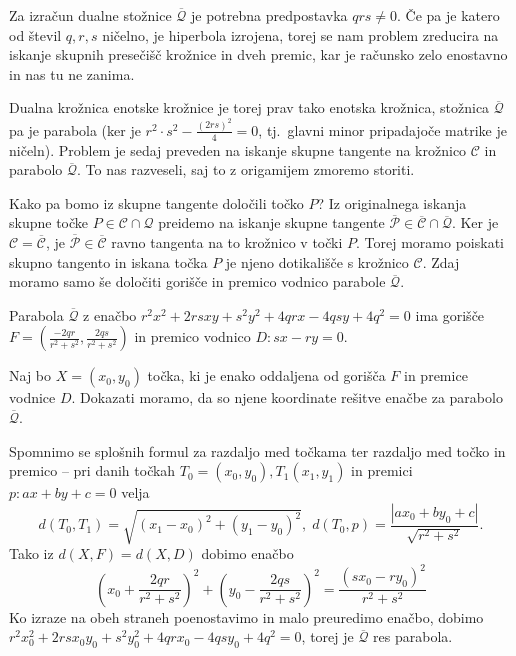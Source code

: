 \begin{opomba}
    Za izračun dualne stožnice $\mathcal{\overline{Q}}$ je potrebna predpostavka $qrs \neq 0$. Če pa je katero od števil $q, r, s$ ničelno, je hiperbola izrojena, torej se nam problem zreducira na iskanje skupnih presečišč krožnice in dveh premic, kar je računsko zelo enostavno in nas tu ne zanima.
\end{opomba}

Dualna krožnica enotske krožnice je torej prav tako enotska krožnica, stožnica $\mathcal{\overline{Q}}$ pa je parabola (ker je $r^2 \cdot s^2 - \frac{(2rs)^2}{4} = 0$, tj.\ glavni minor pripadajoče matrike je ničeln). Problem je sedaj preveden na iskanje skupne tangente na krožnico $\mathcal{C}$ in parabolo $\mathcal{\overline{Q}}$. To nas razveseli, saj to z origamijem zmoremo storiti.

Kako pa bomo iz skupne tangente določili točko $P$? Iz originalnega iskanja skupne točke $P \in \mathcal{C} \cap \mathcal{Q}$ preidemo na iskanje skupne tangente $\mathcal{\overline{P}} \in \mathcal{\overline{C}} \cap \mathcal{\overline{Q}}$. Ker je $\mathcal{C} = \mathcal{\overline{C}}$, je $\mathcal{\overline{P}} \in \mathcal{\overline{C}}$ ravno tangenta na to krožnico v točki $P$. Torej moramo poiskati skupno tangento in iskana točka $P$ je njeno dotikališče s krožnico $\mathcal{C}$. Zdaj moramo samo še določiti gorišče in premico vodnico parabole $\mathcal{\overline{Q}}$.

\begin{trditev}
    Parabola $\mathcal{\overline{Q}}$ z enačbo $r^2x^2 + 2rsxy + s^2y^2 + 4qrx - 4qsy + 4q^2 = 0$ ima gorišče $F = \left( \frac{-2qr}{r^2+s^2}, \frac{2qs}{r^2+s^2} \right)$ in premico vodnico $D: sx-ry = 0$.
\end{trditev}
\begin{dokaz}
    Naj bo $X = (x_0, y_0)$ točka, ki je enako oddaljena od gorišča $F$ in premice vodnice $D$. Dokazati moramo, da so njene koordinate rešitve enačbe za parabolo $\mathcal{\overline{Q}}$.

    Spomnimo se splošnih formul za razdaljo med točkama ter razdaljo med točko in premico -- pri danih točkah $T_0 = (x_0, y_0), T_1(x_1, y_1)$ in premici $p: ax + by + c = 0$ velja
    $$ d(T_0, T_1) = \sqrt{(x_1-x_0)^2 + (y_1-y_0)^2}, \; d(T_0, p) = \frac{|ax_0+by_0+c|}{\sqrt{r^2+s^2}}.$$
    Tako iz $d(X, F) = d(X, D)$ dobimo enačbo
    $$ \left( x_0 + \frac{2qr}{r^2+s^2} \right)^2 + \left( y_0 - \frac{2qs}{r^2+s^2} \right)^2 = \frac{(sx_0 - ry_0)^2}{r^2+s^2} $$
    Ko izraze na obeh straneh poenostavimo in malo preuredimo enačbo, dobimo $r^2x_0^2 + 2rsx_0y_0 + s^2y_0^2 + 4qrx_0 - 4qsy_0 + 4q^2 = 0$, torej je $\mathcal{\overline{Q}}$ res parabola.
\end{dokaz}

